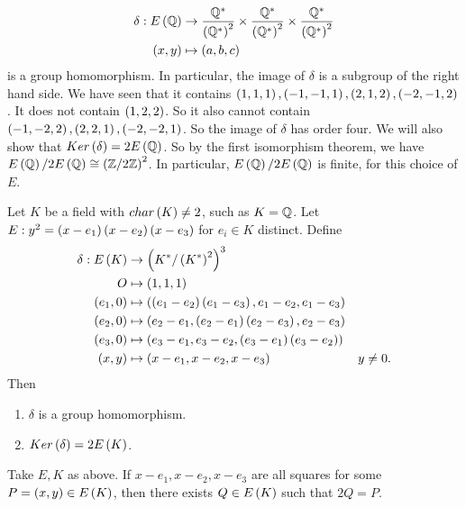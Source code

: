\begin{example*}
\begin{align*}
\delta : E\left( \mathbb{Q} \right) & \to \dfrac{\mathbb{Q}^*}{\left( \mathbb{Q}^* \right)^2} \times \dfrac{\mathbb{Q}^*}{\left( \mathbb{Q}^* \right)^2} \times \dfrac{\mathbb{Q}^*}{\left( \mathbb{Q}^* \right)^2} \\
\left( x, y \right) & \mapsto \left( a, b, c \right)
\end{align*}
is a group homomorphism. In particular, the image of $ \delta $ is a subgroup of the right hand side. We have seen that it contains $ \left( 1, 1, 1 \right), \left( -1, -1, 1 \right), \left( 2, 1, 2 \right), \left( -2, -1, 2 \right) $. It does not contain $ \left( 1, 2, 2 \right) $. So it also cannot contain $ \left( -1, -2, 2 \right), \left( 2, 2, 1 \right), \left( -2, -2, 1 \right) $. So the image of $ \delta $ has order four. We will also show that $ Ker\left( \delta \right) = 2E\left( \mathbb{Q} \right) $. So by the first isomorphism theorem, we have $ E\left( \mathbb{Q} \right) / 2E\left( \mathbb{Q} \right) \cong \left( \mathbb{Z} / 2\mathbb{Z} \right)^2 $. In particular, $ E\left( \mathbb{Q} \right) / 2E\left( \mathbb{Q} \right) $ is finite, for this choice of $ E $.
\end{example*}


\begin{theorem}
\label{thm:8.2}
Let $ K $ be a field with $ char\left( K \right) \ne 2 $, such as $ K = \mathbb{Q} $. Let $ E : y^2 = \left( x - e_1 \right)\left( x - e_2 \right)\left( x - e_3 \right) $ for $ e_i \in K $ distinct. Define
\begin{align*}
\delta : E\left( K \right) & \to \left( K^* / \left( K^* \right)^2 \right)^3 \\
O & \mapsto \left( 1, 1, 1 \right) \\
\left( e_1, 0 \right) & \mapsto \left( \left( e_1 - e_2 \right)\left( e_1 - e_3 \right), e_1 - e_2, e_1 - e_3 \right) \\
\left( e_2, 0 \right) & \mapsto \left( e_2 - e_1, \left( e_2 - e_1 \right)\left( e_2 - e_3 \right), e_2 - e_3 \right) \\
\left( e_3, 0 \right) & \mapsto \left( e_3 - e_1, e_3 - e_2, \left( e_3 - e_1 \right)\left( e_3 - e_2 \right) \right) \\
\left( x, y \right) & \mapsto \left( x - e_1, x - e_2, x - e_3 \right) & y \ne 0.
\end{align*}
Then
\begin{enumerate}
\item $ \delta $ is a group homomorphism.
\item $ Ker\left( \delta \right) = 2E\left( K \right) $.
\end{enumerate}
\end{theorem}

\pagebreak

\begin{lemma}
\label{lem:8.3}
Take $ E, K $ as above. If $ x - e_1, x - e_2, x - e_3 $ are all squares for some $ P = \left( x, y \right) \in E\left( K \right) $, then there exists $ Q \in E\left( K \right) $ such that $ 2Q = P $.
\end{lemma}

